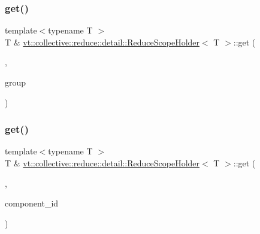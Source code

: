 \mbox{\label{structvt_1_1collective_1_1reduce_1_1detail_1_1_reduce_scope_holder_a666bfa6fa622e3954d6f1a267de48c2e}} 
\subsubsection{\texorpdfstring{get()}{get()}\hspace{0.1cm}{\footnotesize\ttfamily [4/6]}}
{\footnotesize\ttfamily template$<$typename T $>$ \\
T \& \hyperlink{structvt_1_1collective_1_1reduce_1_1detail_1_1_reduce_scope_holder}{vt\+::collective\+::reduce\+::detail\+::\+Reduce\+Scope\+Holder}$<$ T $>$\+::get (\begin{DoxyParamCaption}\item[{\hyperlink{structvt_1_1collective_1_1reduce_1_1detail_1_1_reduce_scope_holder_1_1_group_tag}{Group\+Tag}}]{,  }\item[{\hyperlink{namespacevt_a27b5e4411c9b6140c49100e050e2f743}{Group\+Type}}]{group }\end{DoxyParamCaption})}

\mbox{\label{structvt_1_1collective_1_1reduce_1_1detail_1_1_reduce_scope_holder_af25ba6525fc0742740c635d9eaa540de}} 
\subsubsection{\texorpdfstring{get()}{get()}\hspace{0.1cm}{\footnotesize\ttfamily [5/6]}}
{\footnotesize\ttfamily template$<$typename T $>$ \\
T \& \hyperlink{structvt_1_1collective_1_1reduce_1_1detail_1_1_reduce_scope_holder}{vt\+::collective\+::reduce\+::detail\+::\+Reduce\+Scope\+Holder}$<$ T $>$\+::get (\begin{DoxyParamCaption}\item[{\hyperlink{structvt_1_1collective_1_1reduce_1_1detail_1_1_reduce_scope_holder_1_1_component_tag}{Component\+Tag}}]{,  }\item[{\hyperlink{namespacevt_ab6ac935c168b809c422d5121da4f2700}{Component\+I\+D\+Type}}]{component\+\_\+id }\end{DoxyParamCaption})}

